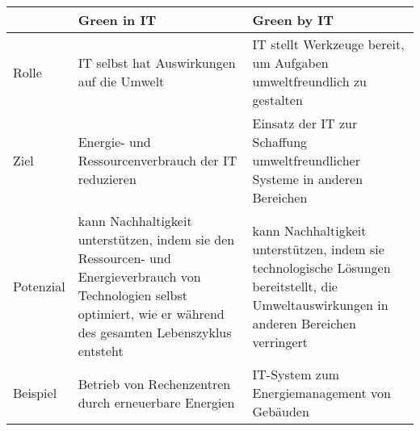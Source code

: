 \begin{tabular}{|p{2cm}|p{6cm}|p{6cm}|}
    \hline
     & Green in IT & Green by IT \\
    \hline
    \hline
    Rolle & IT selbst hat Auswirkungen auf die Umwelt & IT stellt Werkzeuge bereit, um Aufgaben umweltfreundlich zu gestalten \\
    \hline
    Ziel & Energie- und Ressourcenverbrauch der IT reduzieren & Einsatz der IT zur Schaffung umweltfreundlicher Systeme in anderen Bereichen \\
    \hline
    Potenzial & kann Nachhaltigkeit unterstützen, indem sie den Ressourcen- und Energieverbrauch von Technologien selbst optimiert, wie er während des gesamten Lebenszyklus entsteht & kann Nachhaltigkeit unterstützen, indem sie technologische Lösungen bereitstellt, die Umweltauswirkungen in anderen Bereichen verringert \\
    \hline
    Beispiel & Betrieb von Rechenzentren durch erneuerbare Energien & IT-System zum Energiemanagement von Gebäuden \\
    \hline
\end{tabular}
